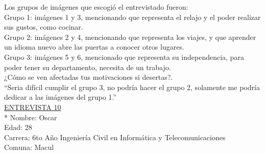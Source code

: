 Los grupos de imágenes que escogió el entrevistado fueron:\\

Grupo 1: imágenes 1 y 3, mencionando que representa el relajo y el poder realizar sus gustos, como cocinar. \\

Grupo 2: imágenes 2 y 4, mencionando que representa los viajes, y que aprender un idioma nuevo abre las puertas a conocer otros lugares.\\

Grupo 3: imágenes 5 y 6, mencionado que representa su independencia, para poder tener su departamento, necesita de un trabajo.\\


¿Cómo se ven afectadas tus motivaciones si desertas?.\\

``Seria difícil cumplir el grupo 3, no podría hacer el grupo 2, solamente me podría dedicar a las imágenes del grupo 1.'' \\


\underline {ENTREVISTA 10}\\*
Nombre: Oscar\\
Edad: 28\\
Carrera: 6to Año Ingeniería Civil en Informática y Telecomunicaciones \\
Comuna: Macul \\

